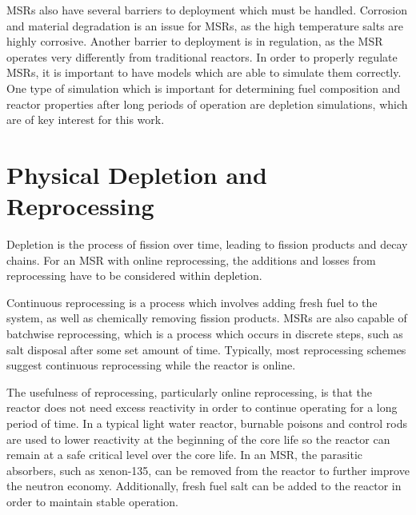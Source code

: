 MSRs also have several barriers to deployment which must be handled. Corrosion and material degradation is an issue for MSRs, as the high temperature salts are highly corrosive. Another barrier to deployment is in regulation, as the MSR operates very differently from traditional reactors. In order to properly regulate MSRs, it is important to have models which are able to simulate them correctly. One type of simulation which is important for determining fuel composition and reactor properties after long periods of operation are depletion simulations, which are of key interest for this work.

\section{Physical Depletion and Reprocessing}


Depletion is the process of fission over time, leading to fission products and decay chains. For an MSR with online reprocessing, the additions and losses from reprocessing have to be considered within depletion.

Continuous reprocessing is a process which involves adding fresh fuel to the system, as well as chemically removing fission products. MSRs are also capable of batchwise reprocessing, which is a process which occurs in discrete steps, such as salt disposal after some set amount of time. Typically, most reprocessing schemes suggest continuous reprocessing while the reactor is online.

The usefulness of reprocessing, particularly online reprocessing, is that the reactor does not need excess reactivity in order to continue operating for a long period of time. In a typical light water reactor, burnable poisons and control rods are used to lower reactivity at the beginning of the core life so the reactor can remain at a safe critical level over the core life. In an MSR, the parasitic absorbers, such as xenon-135, can be removed from the reactor to further improve the neutron economy. Additionally, fresh fuel salt can be added to the reactor in order to maintain stable operation.

